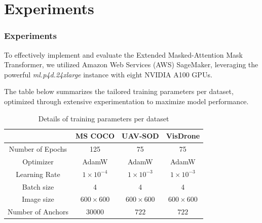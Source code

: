 \documentclass{beamer}
\begin{document}
\section{Experiments}
\begin{frame}[t]
  \frametitle{Experiments}
  To effectively implement and evaluate the Extended Masked-Attention Mask Transformer, we utilized Amazon Web Services (AWS) SageMaker, 
  leveraging the powerful \textit{ml.p4d.24xlarge} instance with eight NVIDIA A100 GPUs.

  \vspace{1cm}
  
  The table below summarizes the tailored training parameters per dataset, optimized through extensive experimentation to maximize model performance.

  \begin{table}[h]
    \scriptsize
    \centering
    \begin{tabular}{|c|c|c|c|}
        \hline
        &                   \textbf{MS COCO}      & \textbf{UAV-SOD}     & \textbf{VisDrone}            \\ \hline
        Number of Epochs   & 125                  & 75                   & 75                           \\ \hline
        Optimizer          & AdamW                & AdamW                & AdamW                        \\ \hline
        Learning Rate      & $1 \times 10^{-4}$   & $1 \times 10^{-3}$   & $1 \times 10^{-3}$           \\ \hline
        Batch size         & 4                    &  4                   & 4                            \\ \hline
        Image size         & $600\times600$       &  $600\times600$      & $600\times600$               \\ \hline
        Number of Anchors  & $30000$              &  $722$               & $722$                        \\ \hline
    \end{tabular}
    \caption{Details of training parameters per dataset}
    \label{tab:training_parameters}
  \end{table}
\end{frame}
\end{document}
